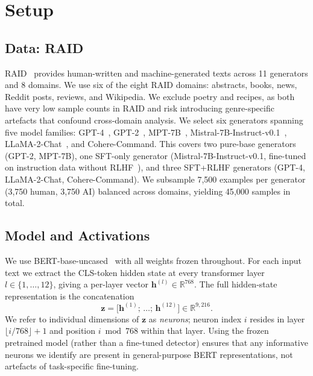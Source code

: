 \documentclass[11pt]{article}
\newcommand{\bertbase}{BERT-base-uncased\xspace}
\begin{document}
\section{Setup}
\label{sec:setup}

\subsection{Data: RAID}
\label{sec:setup-data}

RAID~\citep{dugan2024raid} provides human-written and machine-generated texts across 11 generators and 8 domains. We use six of the eight RAID domains: abstracts, books, news, Reddit posts, reviews, and Wikipedia. We exclude poetry and recipes, as both have very low sample counts in RAID and risk introducing genre-specific artefacts that confound cross-domain analysis. We select six generators spanning five model families: GPT-4~\citep{openai2023gpt4}, GPT-2~\citep{radford2019gpt2}, MPT-7B~\citep{mosaicml2023mpt}, Mistral-7B-Instruct-v0.1~\citep{jiang2023mistral}, LLaMA-2-Chat~\citep{touvron2023llama2}, and Cohere-Command. This covers two pure-base generators (GPT-2, MPT-7B), one SFT-only generator (Mistral-7B-Instruct-v0.1, fine-tuned on instruction data without RLHF~\citep{jiang2023mistral}), and three SFT+RLHF generators (GPT-4, LLaMA-2-Chat, Cohere-Command). We subsample 7{,}500 examples per generator (3{,}750 human, 3{,}750 AI) balanced across domains, yielding 45{,}000 samples in total.

\subsection{Model and Activations}
\label{sec:setup-model}

We use \bertbase~\citep{devlin2019bert} with all weights frozen throughout. For each input text we extract the CLS-token hidden state at every transformer layer $l \in \{1, \ldots, 12\}$, giving a per-layer vector $\mathbf{h}^{(l)} \in \mathbb{R}^{768}$. The full hidden-state representation is the concatenation
\[
  \mathbf{z} = \bigl[\mathbf{h}^{(1)};\, \ldots;\, \mathbf{h}^{(12)}\bigr] \in \mathbb{R}^{9{,}216}.
\]
We refer to individual dimensions of $\mathbf{z}$ as \textit{neurons}; neuron index $i$ resides in layer $\lfloor i / 768 \rfloor + 1$ and position $i \bmod 768$ within that layer. Using the frozen pretrained model (rather than a fine-tuned detector) ensures that any informative neurons we identify are present in general-purpose BERT representations, not artefacts of task-specific fine-tuning.
\end{document}
